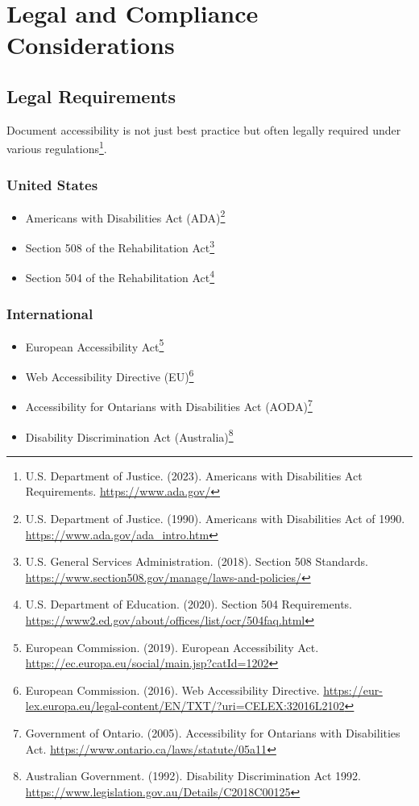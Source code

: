\section{Legal and Compliance Considerations}

\subsection{Legal Requirements}
Document accessibility is not just best practice but often legally required under various regulations\footnote{U.S. Department of Justice. (2023). Americans with Disabilities Act Requirements. \url{https://www.ada.gov/}}.

\subsubsection{United States}
\begin{itemize}
\item Americans with Disabilities Act (ADA)\footnote{U.S. Department of Justice. (1990). Americans with Disabilities Act of 1990. \url{https://www.ada.gov/ada_intro.htm}}
\item Section 508 of the Rehabilitation Act\footnote{U.S. General Services Administration. (2018). Section 508 Standards. \url{https://www.section508.gov/manage/laws-and-policies/}}
\item Section 504 of the Rehabilitation Act\footnote{U.S. Department of Education. (2020). Section 504 Requirements. \url{https://www2.ed.gov/about/offices/list/ocr/504faq.html}}
\end{itemize}

\subsubsection{International}
\begin{itemize}
\item European Accessibility Act\footnote{European Commission. (2019). European Accessibility Act. \url{https://ec.europa.eu/social/main.jsp?catId=1202}}
\item Web Accessibility Directive (EU)\footnote{European Commission. (2016). Web Accessibility Directive. \url{https://eur-lex.europa.eu/legal-content/EN/TXT/?uri=CELEX:32016L2102}}
\item Accessibility for Ontarians with Disabilities Act (AODA)\footnote{Government of Ontario. (2005). Accessibility for Ontarians with Disabilities Act. \url{https://www.ontario.ca/laws/statute/05a11}}
\item Disability Discrimination Act (Australia)\footnote{Australian Government. (1992). Disability Discrimination Act 1992. \url{https://www.legislation.gov.au/Details/C2018C00125}}
\end{itemize}

